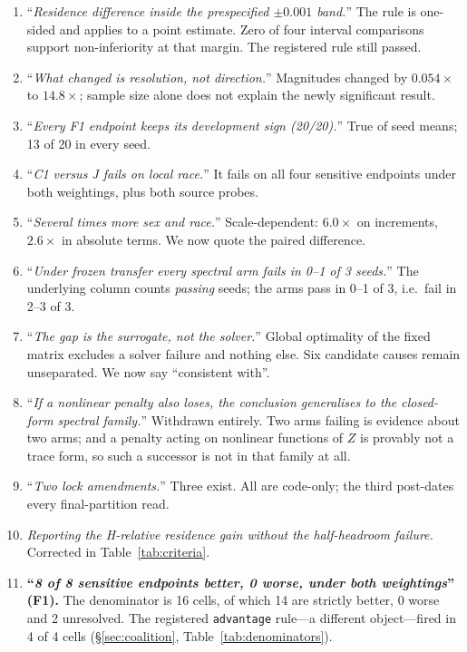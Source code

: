 \documentclass[10pt]{article}
\begin{document}
\begin{enumerate}\itemsep1pt
\item ``\emph{Residence difference inside the prespecified $\pm0.001$ band.}'' The rule is one-sided
and applies to a point estimate. Zero of four interval comparisons support non-inferiority at that
margin. The registered rule still passed.
\item ``\emph{What changed is resolution, not direction.}'' Magnitudes changed by $0.054\times$ to
$14.8\times$; sample size alone does not explain the newly significant result.
\item ``\emph{Every F1 endpoint keeps its development sign (20/20).}'' True of seed means; 13 of 20
in every seed.
\item ``\emph{C1 versus J fails on local race.}'' It fails on all four sensitive endpoints under both
weightings, plus both source probes.
\item ``\emph{Several times more sex and race.}'' Scale-dependent: $6.0\times$ on increments,
$2.6\times$ in absolute terms. We now quote the paired difference.
\item ``\emph{Under frozen transfer every spectral arm fails in 0--1 of 3 seeds.}'' The underlying
column counts \emph{passing} seeds; the arms pass in 0--1 of 3, i.e.\ fail in 2--3 of 3.
\item ``\emph{The gap is the surrogate, not the solver.}'' Global optimality of the fixed matrix
excludes a solver failure and nothing else. Six candidate causes remain unseparated. We now say
``consistent with''.
\item ``\emph{If a nonlinear penalty also loses, the conclusion generalises to the closed-form
spectral family.}'' Withdrawn entirely. Two arms failing is evidence about two arms; and a penalty
acting on nonlinear functions of $Z$ is provably not a trace form, so such a successor is not in
that family at all.
\item ``\emph{Two lock amendments.}'' Three exist. All are code-only; the third post-dates every
final-partition read.
\item \emph{Reporting the H-relative residence gain without the half-headroom failure.} Corrected in
Table~\ref{tab:criteria}.
\item \textbf{``\emph{8 of 8 sensitive endpoints better, 0 worse, under both weightings}'' (F1).}
The denominator is 16 cells, of which 14 are strictly better, 0 worse and 2 unresolved. The
registered \texttt{advantage} rule---a different object---fired in 4 of 4 cells
(\S\ref{sec:coalition}, Table~\ref{tab:denominators}).

\end{enumerate}
\end{document}
